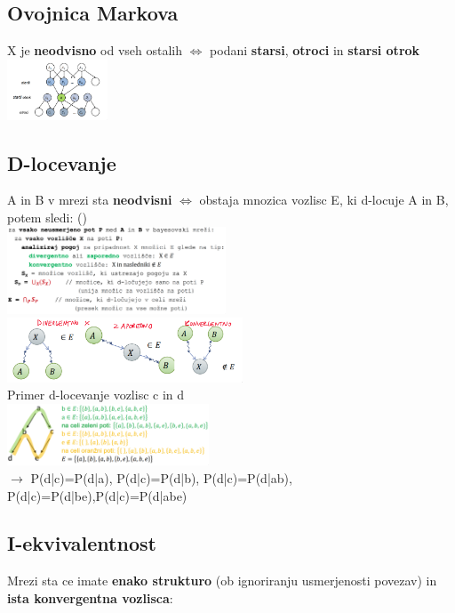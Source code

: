 \subsection{Ovojnica Markova}
X je \textbf{neodvisno} od vseh ostalih $\Leftrightarrow$ podani \textbf{starsi}, \textbf{otroci} in \textbf{starsi otrok}\\
\includegraphics[width=3cm]{images/ovojnica-markova.png}
\subsection{D-locevanje}
A in B v mrezi sta \textbf{neodvisni} $\Leftrightarrow$ obstaja mnozica vozlisc E, ki d-locuje A in B, potem sledi:  ()\\
\includegraphics[width=6.5cm]{images/d-locevanje-algoritem.png}
\includegraphics*[width=7cm]{images/d-locevanje-nacini.png}
\\
Primer d-locevanje vozlisc c in d\\
\includegraphics*[width=6cm]{images/primer-d-locevanje.png}\\
$\rightarrow$ P(d|c)=P(d|a), P(d|c)=P(d|b), P(d|c)=P(d|ab),\\
P(d|c)=P(d|be),P(d|c)=P(d|abe)
\subsection{I-ekvivalentnost}
Mrezi sta  ce imate \textbf{enako strukturo} (ob ignoriranju usmerjenosti povezav) in \textbf{ista konvergentna vozlisca}:\\